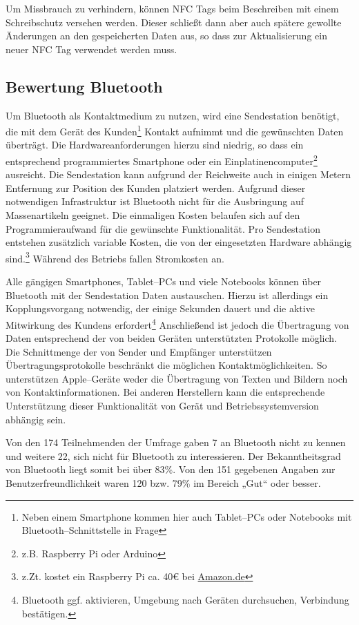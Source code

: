 Um Missbrauch zu verhindern, können NFC Tags beim Beschreiben mit einem Schreibschutz versehen werden. Dieser schließt dann aber auch spätere gewollte Änderungen an den gespeicherten Daten aus, so dass zur Aktualisierung ein neuer NFC Tag verwendet werden muss.

\subsection{Bewertung Bluetooth} %
\label{sub:bewertung_bluetooth}
Um Bluetooth als Kontaktmedium zu nutzen, wird eine Sendestation benötigt, die mit dem Gerät des Kunden\footnote{Neben einem Smartphone kommen hier auch Tablet–PCs oder Notebooks mit Bluetooth–Schnittstelle in Frage} Kontakt aufnimmt und die gewünschten Daten überträgt. Die Hardwareanforderungen hierzu sind niedrig, so dass ein entsprechend programmiertes Smartphone oder ein Einplatinencomputer\footnote{z.B. Raspberry Pi oder Arduino} ausreicht. Die Sendestation kann aufgrund der Reichweite auch in einigen Metern Entfernung zur Position des Kunden platziert werden. Aufgrund dieser notwendigen Infrastruktur ist Bluetooth nicht für die Ausbringung auf Massenartikeln geeignet. Die einmaligen Kosten belaufen sich auf den Programmieraufwand für die gewünschte Funktionalität. Pro Sendestation entstehen zusätzlich variable Kosten, die von der eingesetzten Hardware abhängig sind.\footnote{z.Zt. kostet ein Raspberry Pi ca. 40€ bei \url{Amazon.de}} Während des Betriebs fallen Stromkosten an.

Alle gängigen Smartphones, Tablet–PCs und viele Notebooks können über Bluetooth mit der Sendestation Daten austauschen. Hierzu ist allerdings ein Kopplungsvorgang notwendig, der einige Sekunden dauert und die aktive Mitwirkung des Kundens erfordert\footnote{Bluetooth ggf. aktivieren, Umgebung nach Geräten durchsuchen, Verbindung bestätigen.} Anschließend ist jedoch die Übertragung von Daten entsprechend der von beiden Geräten unterstützten Protokolle möglich. Die Schnittmenge der von Sender und Empfänger unterstützen Übertragungsprotokolle beschränkt die möglichen Kontaktmöglichkeiten. So unterstützen Apple–Geräte weder die Übertragung von Texten und Bildern noch von Kontaktinformationen. Bei anderen Herstellern kann die entsprechende Unterstützung dieser Funktionalität von Gerät und Betriebssystemversion abhängig sein.

Von den 174 Teilnehmenden der Umfrage gaben 7 an Bluetooth nicht zu kennen und weitere 22, sich nicht für Bluetooth zu interessieren. Der Bekanntheitsgrad von Bluetooth liegt somit bei über 83\%. Von den 151 gegebenen Angaben zur Benutzerfreundlichkeit waren 120 bzw. 79\% im Bereich „Gut“ oder besser.

